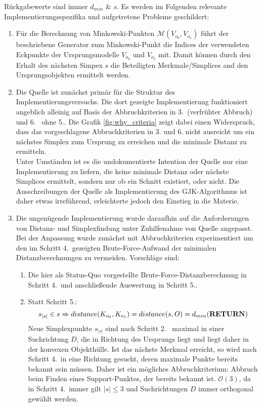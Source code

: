Rückgabewerte sind immer $d_{min}$ \& $s$.
Es werden im Folgenden relevante Implementierungsspezifika und aufgetretene Probleme geschildert:\\
\begin{enumerate}
\item Für die Berechnung von Minkowski-Punkten $\mathcal{M}(V_{o_0}, V_{o_1})$ führt der beschriebene Generator zum Minkowski-Punkt die Indices der verwendeten Eckpunkte der Ursprungsmodelle $V_{o_0}$ und $V_{o_1}$ mit. Damit können durch den Erhalt des nächsten Simpex $s$ die Beteiligten Merkmale/Simplices and den Ursprungsobjekten ermittelt werden.
\item Die Quelle \cite{gjk-casey} ist zunächst primär für die Struktur des Implementierungsversuchs. Die dort gezeigte Implementierung funktioniert angeblich alleinig auf Basis der Abbruchkriterien in 3.~(verfrühter Abbruch) und 6.~ ohne 5..
Die Grafik \ref{fig:why_criteria} zeigt dabei einen Widerspruch, dass das vorgeschlagene Abbruchkriterien in 3. und 6. nicht ausreicht um ein nächstes Simplex zum Ursprung zu erreichen und die minimale Distanz zu ermitteln.\\
Unter Umständen ist es die undokumentierte Intention der Quelle \cite{gjk-casey} nur eine Implementierung zu liefern, die keine minimale Distanz oder nächste Simplices ermittelt, sondern nur ob ein Schnitt existiert, oder nicht. Die Ausschreibungen der Quelle als Implementierung des GJK-Algorithmus ist daher etwas irreführend, erleichterte jedoch den Einstieg in die Materie.
\item Die ungenügende Implementierung wurde daraufhin auf die Anforderungen von Distanz- und Simplexfindung unter Zuhilfenahme von Quelle \cite{gjk} angepasst.
Bei der Anpassung wurde zunächst mit Abbruchkriterien experimentiert um den im Schritt 4.~gezeigten Brute-Force-Aufwand der minimalen Distanzberechnungen zu vermeiden. Vorschläge sind:
\begin{enumerate}
	\item Die hier als Status-Quo vorgestellte Brute-Force-Distanzberechnung in Schritt 4.~und anschließende Auswertung in Schritt 5..
	\item Statt Schritt 5.:
	 $$s_{|s|} \in s \Rightarrow distance(K_{o_0}, K_{o_1}) = distance(s, O) = d_{min}\text{(\textbf{RETURN})}$$ 
	 Neue Simplexpunkte $s_{|s|}$ sind nach Schritt 2.~ maximal in einer Suchrichtung $D$, die in Richtung des Ursprungs liegt und liegt daher in der konvexen Objekthülle. Ist das nächste Merkmal erreicht, so wird nach Schritt 4.~in eine Richtung gesucht, deren maximale Punkte bereits bekannt sein müssen. Daher ist ein mögliches Abbruchkriterium: Abbruch beim Finden eines Support-Punktes, der bereits bekannt ist. $\mathcal{O}(3)$, da in Schritt 4.~immer gilt $|s|\leq 3$ und Suchrichtungen $D$ immer orthogonal gewählt werden.

\end{enumerate}
\end{enumerate}
